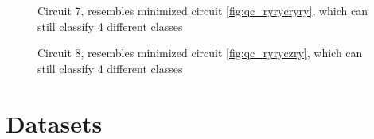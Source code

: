 \begin{figure}[!ht]
    \centering
    \caption{Circuit 7, resembles minimized circuit \ref{fig:qc_ryrycryry}, which can still classify 4 different classes}
    \label{fig:qc_ryryrycry_2qbit}
\end{figure}

\begin{figure}[!ht]
    \centering
    \caption{Circuit 8, resembles minimized circuit \ref{fig:qc_ryryczry}, which can still classify 4 different classes}
    \label{fig:qc_ryryczry_2qbit}
\end{figure}

\clearpage

\section{Datasets}
\label{chapter:datasets}

